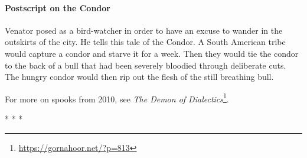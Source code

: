 \paragraph{Postscript on the Condor}
Venator posed as a bird-watcher in order to have an excuse to wander in the outskirts of the city. He tells this tale of the Condor. A South American tribe would capture a condor and starve it for a week. Then they would tie the condor to the back of a bull that had been severely bloodied through deliberate cuts. The hungry condor would then rip out the flesh of the still breathing bull.

For more on spooks from 2010, see \textit{The Demon of Dialectics}\footnote{\url{https://gornahoor.net/?p=813}}.


\begin{center}* * *\end{center}

